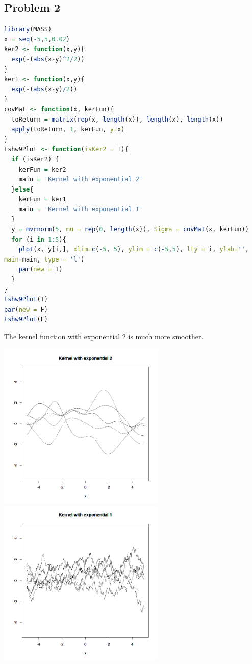 \documentclass{article}
\begin{document}
\begin{CJK*}{GBK}{song}
\section*{Problem 2}
\begin{lstlisting}[language=R,keywordstyle=\color{blue!70},commentstyle=\color{red!50!green!50!blue!50},frame=single,rulesepcolor=\color{red!20!green!20!blue!20},backgroundcolor=\color{backcolour},
]
library(MASS)
x = seq(-5,5,0.02)
ker2 <- function(x,y){
  exp(-(abs(x-y)^2/2))
}
ker1 <- function(x,y){
  exp(-(abs(x-y)/2))
}
covMat <- function(x, kerFun){
  toReturn = matrix(rep(x, length(x)), length(x), length(x))
  apply(toReturn, 1, kerFun, y=x)
}
tshw9Plot <- function(isKer2 = T){
  if (isKer2) {
    kerFun = ker2
    main = 'Kernel with exponential 2'
  }else{
    kerFun = ker1
    main = 'Kernel with exponential 1'
  }
  y = mvrnorm(5, mu = rep(0, length(x)), Sigma = covMat(x, kerFun))
  for (i in 1:5){
    plot(x, y[i,], xlim=c(-5, 5), ylim = c(-5,5), lty = i, ylab='',
main=main, type = 'l')
    par(new = T)
  }
}
tshw9Plot(T)
par(new = F)
tshw9Plot(F)
\end{lstlisting}
The kernel function with exponential 2 is much more smoother.
\begin{center}
\includegraphics[width=8cm]{3.png}
\includegraphics[width=8cm]{4.png}
\end{center}
\end{CJK*}
\end{document}
